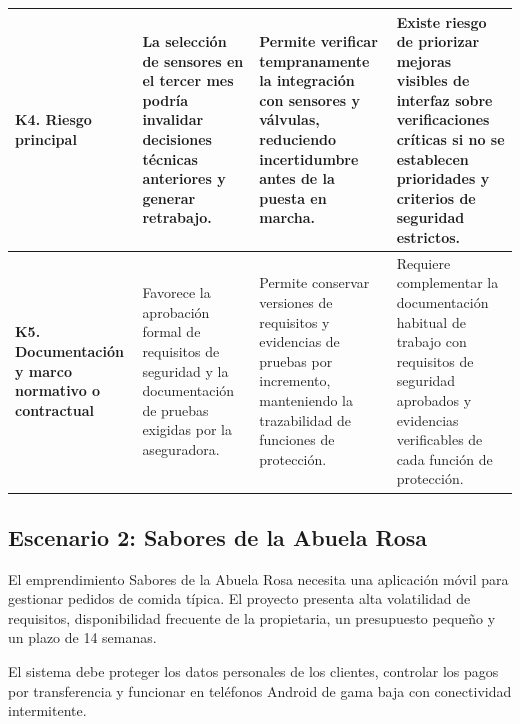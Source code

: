\documentclass[12pt,a4paper]{article}
\begin{document}
\begin{longtable}{|>{\raggedright\arraybackslash}p{}|>{\raggedright\arraybackslash}p{}|>{\raggedright\arraybackslash}p{}|>{\raggedright\arraybackslash}p{}|}
\textbf{K4. Riesgo principal} &
La selección de sensores en el tercer mes podría
invalidar decisiones técnicas anteriores y
generar retrabajo. &
Permite verificar tempranamente la integración
con sensores y válvulas, reduciendo incertidumbre
antes de la puesta en marcha. &
Existe riesgo de priorizar mejoras visibles de
interfaz sobre verificaciones críticas si no se
establecen prioridades y criterios de seguridad
estrictos. \\
\hline

\textbf{K5. Documentación y marco normativo o contractual} &
Favorece la aprobación formal de requisitos de
seguridad y la documentación de pruebas exigidas
por la aseguradora. &
Permite conservar versiones de requisitos y
evidencias de pruebas por incremento, manteniendo
la trazabilidad de funciones de protección. &
Requiere complementar la documentación habitual
de trabajo con requisitos de seguridad aprobados
y evidencias verificables de cada función de
protección. \\
\hline

\end{longtable}
\endgroup

\normalsize

\clearpage


\subsection{Escenario 2: Sabores de la Abuela Rosa}

El emprendimiento Sabores de la Abuela Rosa necesita
una aplicación móvil para gestionar pedidos de comida
típica. El proyecto presenta alta volatilidad de
requisitos, disponibilidad frecuente de la propietaria,
un presupuesto pequeño y un plazo de 14 semanas.

El sistema debe proteger los datos personales de los
clientes, controlar los pagos por transferencia y
funcionar en teléfonos Android de gama baja con
conectividad intermitente.

\begingroup
\footnotesize
\setlength{\tabcolsep}{4pt}
\renewcommand{\arraystretch}{1.24}
\setlength{\LTleft}{0pt}
\setlength{\LTright}{0pt}
\end{document}

